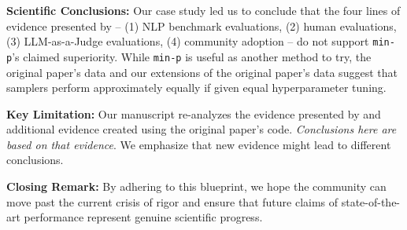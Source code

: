 \textbf{Scientific Conclusions: } Our case study led us to conclude that the four lines of evidence presented by \citet{nguyen2024minp} -- (1) NLP benchmark evaluations, (2) human evaluations, (3) LLM-as-a-Judge evaluations, (4) community adoption -- do not support \texttt{min-p}'s claimed superiority.
While \texttt{min-p} is useful as another method to try, the original paper's data and our extensions of the original paper's data suggest that samplers perform approximately equally if given equal hyperparameter tuning.

\textbf{Key Limitation: } Our manuscript re-analyzes the evidence presented by \citet{nguyen2024minp} and additional evidence created using the original paper's code. \textit{Conclusions here are based on that evidence}. We emphasize that new evidence might lead to different conclusions.

\textbf{Closing Remark:} By adhering to this blueprint, we hope the community can move past the current crisis of rigor and ensure that future claims of state-of-the-art performance represent genuine scientific progress.
